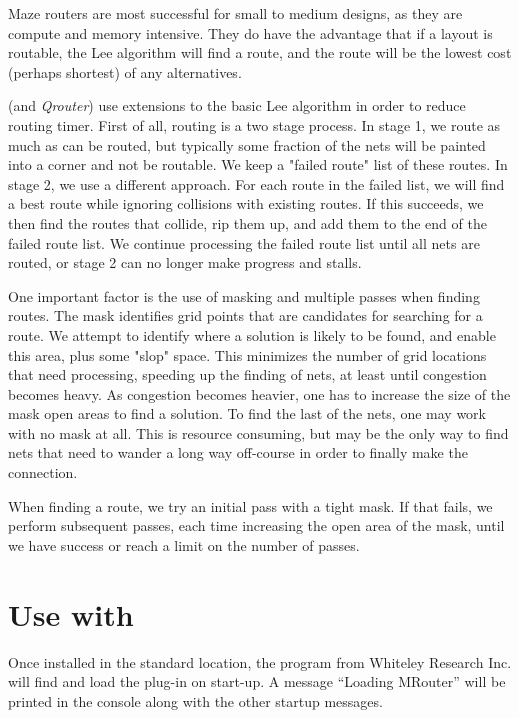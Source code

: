 Maze routers are most successful for small to medium designs, as they
are compute and memory intensive.  They do have the advantage that if
a layout is routable, the Lee algorithm will find a route, and the
route will be the lowest cost (perhaps shortest) of any alternatives.

{\MRouter} (and {\it Qrouter}) use extensions to the basic Lee
algorithm in order to reduce routing timer.  First of all, routing is
a two stage process.  In stage 1, we route as much as can be routed,
but typically some fraction of the nets will be painted into a corner
and not be routable.  We keep a "failed route" list of these routes. 
In stage 2, we use a different approach.  For each route in the failed
list, we will find a best route while ignoring collisions with
existing routes.  If this succeeds, we then find the routes that
collide, rip them up, and add them to the end of the failed route
list.  We continue processing the failed route list until all nets are
routed, or stage 2 can no longer make progress and stalls.

One important factor is the use of masking and multiple passes when
finding routes.  The mask identifies grid points that are candidates
for searching for a route.  We attempt to identify where a solution
is likely to be found, and enable this area, plus some "slop" space. 
This minimizes the number of grid locations that need processing,
speeding up the finding of nets, at least until congestion becomes
heavy.  As congestion becomes heavier, one has to increase the size
of the mask open areas to find a solution.  To find the last of the
nets, one may work with no mask at all.  This is resource consuming,
but may be the only way to find nets that need to wander a long way
off-course in order to finally make the connection.

When finding a route, we try an initial pass with a tight mask.  If
that fails, we perform subsequent passes, each time increasing the
open area of the mask, until we have success or reach a limit on
the number of passes.

\section{Use with {\Xic}}

Once installed in the standard location, the {\Xic} program from
Whiteley Research Inc.  will find and load the plug-in on start-up.  A
message ``{\vt Loading MRouter}'' will be printed in the console along
with the other startup messages.

